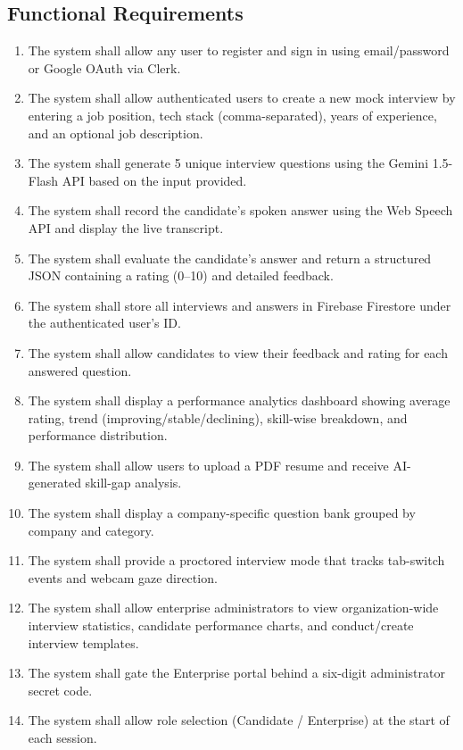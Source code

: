 \subsection{Functional Requirements}
\begin{enumerate}
	\item The system shall allow any user to register and sign in using email/password or Google OAuth via Clerk.
	\item The system shall allow authenticated users to create a new mock interview by entering a job position, tech stack (comma-separated), years of experience, and an optional job description.
	\item The system shall generate 5 unique interview questions using the Gemini 1.5-Flash API based on the input provided.
	\item The system shall record the candidate's spoken answer using the Web Speech API and display the live transcript.
	\item The system shall evaluate the candidate's answer and return a structured JSON containing a rating (0--10) and detailed feedback.
	\item The system shall store all interviews and answers in Firebase Firestore under the authenticated user's ID.
	\item The system shall allow candidates to view their feedback and rating for each answered question.
	\item The system shall display a performance analytics dashboard showing average rating, trend (improving/stable/declining), skill-wise breakdown, and performance distribution.
	\item The system shall allow users to upload a PDF resume and receive AI-generated skill-gap analysis.
	\item The system shall display a company-specific question bank grouped by company and category.
	\item The system shall provide a proctored interview mode that tracks tab-switch events and webcam gaze direction.
	\item The system shall allow enterprise administrators to view organization-wide interview statistics, candidate performance charts, and conduct/create interview templates.
	\item The system shall gate the Enterprise portal behind a six-digit administrator secret code.
	\item The system shall allow role selection (Candidate / Enterprise) at the start of each session.
\end{enumerate}

